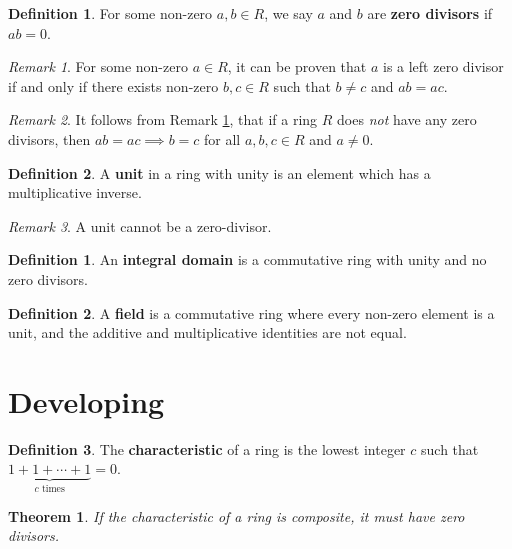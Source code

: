 \documentclass{article}
\newtheorem{theorem}{Theorem}[definition]
\theoremstyle{definition}
\newtheorem{definition}{Definition}[section]
\newtheorem{subdefinition}{Definition}[definition]
\theoremstyle{remark}
\newtheorem{remark}{Remark}[definition]
\begin{document}
\begin{subdefinition}
    For some non-zero $a,b\in R$, we say $a$ and $b$ are \textbf{zero divisors}
    if $ab=0$.
\end{subdefinition}

\begin{remark}
    \label{rem:zero divisor}
    For some non-zero $a\in R$, it can be proven that $a$ is a left zero
    divisor if and only if there exists non-zero $b,c\in R$ such that $b\neq c$
    and $ab=ac$.
\end{remark}

\begin{remark}
    It follows from Remark \ref{rem:zero divisor}, that if a ring $R$ does
    \textit{not} have any zero divisors, then $ab=ac\implies b=c$ for all
    $a,b,c\in R$ and $a\neq 0$.
\end{remark}

\begin{subdefinition}
    A \textbf{unit} in a ring with unity is an element which has a
    multiplicative inverse.
\end{subdefinition}

\begin{remark}
    A unit cannot be a zero-divisor.
\end{remark}


\begin{definition}
    An \textbf{integral domain} is a commutative ring with unity and no zero
    divisors.
\end{definition}


\begin{definition}
    A \textbf{field} is a commutative ring where every non-zero element is a
    unit, and the additive and multiplicative identities are not equal.
\end{definition}


\section{Developing}


\begin{definition}
    The \textbf{characteristic} of a ring is the lowest integer $c$ such that
    $\underbrace{1+1+\cdots+1}_{c\text{ times}}=0$.
\end{definition}

\begin{theorem}
    If the characteristic of a ring is composite, it must have zero divisors.
\end{theorem}
\end{document}
